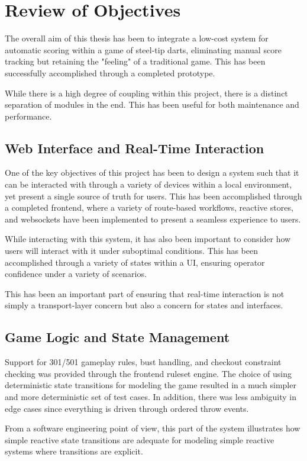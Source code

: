 \setauthor{\firstauthor}
\section{Review of Objectives}
The overall aim of this thesis has been to integrate a low-cost system for automatic scoring within a game of steel-tip darts, eliminating manual score tracking but retaining the "feeling" of a traditional game. This has been successfully accomplished through a completed prototype.

While there is a high degree of coupling within this project, there is a distinct separation of modules in the end. This has been useful for both maintenance and performance.

\subsection{Web Interface and Real-Time Interaction}
One of the key objectives of this project has been to design a system such that it can be interacted with through a variety of devices within a local environment, yet present a single source of truth for users. This has been accomplished through a completed frontend, where a variety of route-based workflows, reactive stores, and websockets have been implemented to present a seamless experience to users.

While interacting with this system, it has also been important to consider how users will interact with it under suboptimal conditions. This has been accomplished through a variety of states within a UI, ensuring operator confidence under a variety of scenarios.

This has been an important part of ensuring that real-time interaction is not simply a transport-layer concern but also a concern for states and interfaces.

\subsection{Game Logic and State Management}
Support for 301/501 gameplay rules, bust handling, and checkout constraint checking was provided through the frontend ruleset engine. The choice of using deterministic state transitions for modeling the game resulted in a much simpler and more deterministic set of test cases. In addition, there was less ambiguity in edge cases since everything is driven through ordered throw events.

From a software engineering point of view, this part of the system illustrates how simple reactive state transitions are adequate for modeling simple reactive systems where transitions are explicit.

